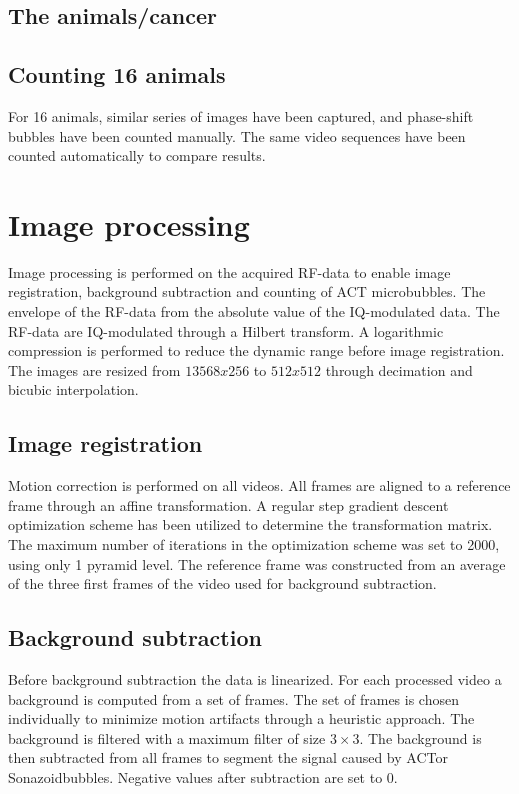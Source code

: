  
\subsection{The animals/cancer}
\subsection{Counting 16 animals}
For 16 animals, similar series of images have been captured, and phase-shift bubbles have been counted manually\cite{Healey2014}. The same video sequences have been counted automatically to compare results. 

\section{Image processing}
Image processing is performed on the acquired RF-data to enable image registration, background subtraction and counting of ACT microbubbles. The envelope of the RF-data from the absolute value of the IQ-modulated data. The RF-data are IQ-modulated through a Hilbert transform. A logarithmic compression is performed to reduce the dynamic range before image registration. The images are resized from $13568x256$ to $512x512$ through decimation and bicubic interpolation.  

\subsection{Image registration}
Motion correction is performed on all videos. All frames are aligned to a reference frame through an affine transformation. A regular step gradient descent optimization scheme has been utilized to determine the transformation matrix. The maximum number of iterations in the optimization scheme was set to 2000, using only 1 pyramid level. The reference frame was constructed from an average of the three first frames of the video used for background subtraction.

\subsection{Background subtraction}
Before background subtraction the data is linearized. For each processed video a background is computed from a set of frames. The set of frames is chosen individually to minimize motion artifacts through a heuristic approach. The background is filtered with a maximum filter of size $3\times 3$. The background is then subtracted from all frames to segment the signal caused by ACT\texttrademark or Sonazoid\texttrademark bubbles. Negative values after subtraction are set to 0. 

